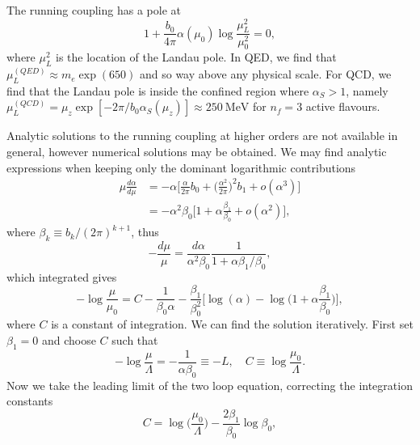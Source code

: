 \begin{obs}
    The running coupling has a pole at 
    \begin{equation}
        1 + \frac{b_0}{4\pi}\alpha(\mu_0)\log{\frac{\mu_L^2}{\mu_0^2}} = 0,
    \end{equation}
    where $\mu_L^2$ is the location of the Landau pole. In QED, we find that $\mu_L^{(QED)} \approx m_e\exp{(650)}$ and so way above any physical scale. For QCD, we find that the Landau pole is inside the confined region where $\alpha_S > 1$, namely $\mu_L^{(QCD)} = \mu_z\exp{[-2\pi/b_0\alpha_S(\mu_z)]} \approx \SI{250}{\MeV}$ for $n_f = 3$ active flavours.
\end{obs}
Analytic solutions to the running coupling at higher orders are not available in general, however numerical solutions may be obtained. We may find analytic expressions when keeping only the dominant logarithmic contributions
\begin{equation}
    \begin{split}
        \mu\frac{d\alpha}{d\mu} &= -\alpha\bigg[\frac{\alpha}{2\pi}b_0 + \bigg(\frac{\alpha^2}{2\pi}\bigg)^2b_1 + o(\alpha^3)\bigg] \\
        &= -\alpha^2\beta_0\bigg[1 + \alpha\frac{\beta_1}{\beta_0} + o(\alpha^2)\bigg],
    \end{split}
\end{equation}
where $\beta_k \equiv b_k/(2\pi)^{k + 1}$, thus 
\begin{equation}
    -\frac{d\mu}{\mu} = \frac{d\alpha}{\alpha^2\beta_0}\frac{1}{1 + \alpha\beta_1/\beta_0},
\end{equation}
which integrated gives
\begin{equation}
    -\log{\frac{\mu}{\mu_0}} = C - \frac{1}{\beta_0\alpha} - \frac{\beta_1}{\beta_0^2}\bigg[\log{(\alpha)} - \log{\bigg(1 + \alpha\frac{\beta_1}{\beta_0}\bigg)}\bigg],
\end{equation}
where $C$ is a constant of integration. We can find the solution iteratively. First set $\beta_1 = 0$ and choose $C$ such that 
\begin{equation}
    -\log{\frac{\mu}{\Lambda}} = -\frac{1}{\alpha\beta_0} \equiv -L,\quad C \equiv \log{\frac{\mu_0}{\Lambda}}.
\end{equation}
Now we take the leading limit of the two loop equation, correcting the integration constants 
\begin{equation}
    C = \log{\bigg(\frac{\mu_0}{\Lambda}\bigg)} - \frac{2\beta_1}{\beta_0}\log{\beta_0},
\end{equation}
